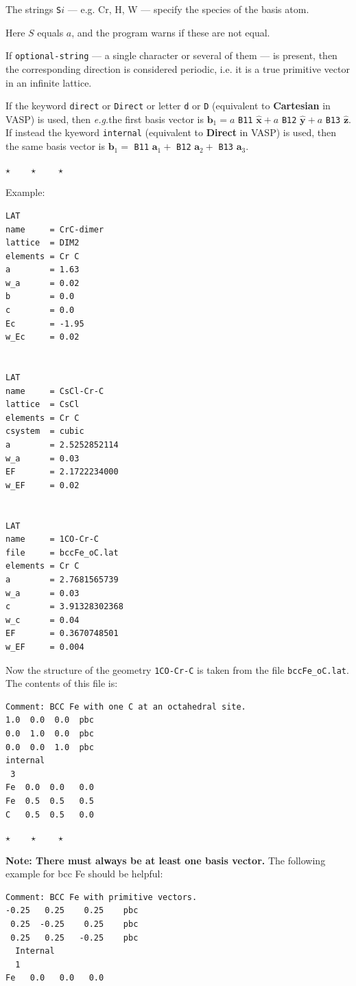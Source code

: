 \documentclass[a4paper,12pt,onecolumn]{article}
\makeatletter
\newcommand{\eg}{\emph{e.g.\@\xspace}}
\def\a{\mathbf{a}}
\def\b{\mathbf{b}}
\def\xhat{\mathbf{\widehat{x}}}
\def\yhat{\mathbf{\widehat{y}}}
\def\zhat{\mathbf{\widehat{z}}}
\newcommand{\stars}{\begin{center} \vspace{0.5cm}$\star \qquad \star \qquad \star$\vspace{0.5cm}\end{center}}
\makeatother
\begin{document}
The strings \verb+S+$i$ --- e.g. Cr, H, W --- specify the species
of the basis atom.

Here $S$ equals $a$, and the program warns if these are not equal.

If \verb+optional-string+ --- a single character or several
of them --- is present, then the corresponding direction is
considered periodic, i.e. it is a true primitive vector
in an infinite lattice.

If the keyword \verb+direct+ or \verb+Direct+ or letter \verb+d+ or \verb+D+
(equivalent to \textbf{Cartesian} in VASP)
is used, then \eg the first basis vector is
$\b_1 = a$ \verb+B11+ $\xhat + a$ \verb+B12+ $\yhat + a$ \verb+B13+ $\zhat$.
If instead the kyeword \verb+internal+
(equivalent to \textbf{Direct} in VASP) is used,
then the same basis vector is
$\b_1 = $ \verb+B11+ $\a_1 + $ \verb+B12+ $\a_2 + $ \verb+B13+ $\a_3$.




\stars


Example:

\begin{verbatim}
LAT
name     = CrC-dimer
lattice  = DIM2
elements = Cr C
a        = 1.63
w_a      = 0.02
b        = 0.0
c        = 0.0
Ec       = -1.95
w_Ec     = 0.02


LAT
name     = CsCl-Cr-C
lattice  = CsCl
elements = Cr C
csystem  = cubic
a        = 2.5252852114
w_a      = 0.03
EF       = 2.1722234000
w_EF     = 0.02


LAT
name     = 1CO-Cr-C
file     = bccFe_oC.lat
elements = Cr C
a        = 2.7681565739
w_a      = 0.03
c        = 3.91328302368
w_c      = 0.04
EF       = 0.3670748501
w_EF     = 0.004

\end{verbatim}

Now the structure of the geometry \verb+1CO-Cr-C+ is taken from the file
\verb+bccFe_oC.lat+. The contents of this file is:

\begin{verbatim}
Comment: BCC Fe with one C at an octahedral site.
1.0  0.0  0.0  pbc
0.0  1.0  0.0  pbc
0.0  0.0  1.0  pbc
internal
 3
Fe  0.0  0.0   0.0
Fe  0.5  0.5   0.5
C   0.5  0.5   0.0
\end{verbatim}



\stars

\textbf{Note: There must always be at least one basis vector.}
The following example for bcc Fe should be helpful:

\begin{verbatim}
Comment: BCC Fe with primitive vectors.
-0.25   0.25    0.25    pbc
 0.25  -0.25    0.25    pbc
 0.25   0.25   -0.25    pbc
  Internal
  1
Fe   0.0   0.0   0.0
\end{verbatim}
\end{document}
